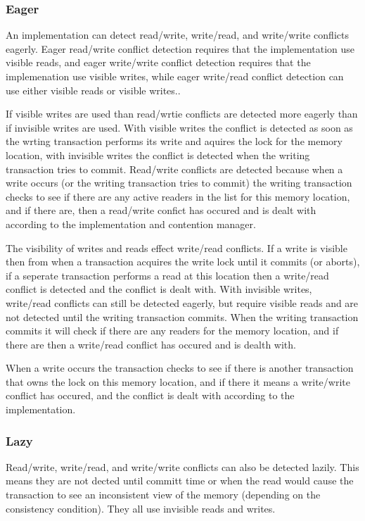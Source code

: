 \subsubsection{Eager}
An implementation can detect read/write, write/read, and write/write conflicts eagerly.
Eager read/write conflict detection requires that the implementation use visible reads, and eager write/write conflict detection requires that the implemenation use visible writes, while eager write/read conflict detection can use either visible reads or visible writes..

If visible writes are used than read/wrtie conflicts are detected more eagerly than if invisible writes are used.
With visible writes the conflict is detected as soon as the wrting transaction performs its write and aquires the lock for the memory location, with invisible writes the conflict is detected when the writing transaction tries to commit.
Read/write conflicts are detected because when a write occurs (or the writing transaction tries to commit) the writing transaction checks to see if there are any active readers in the list for this memory location, and if there are, then a read/write confict has occured and is dealt with according to the implementation and contention manager.

The visibility of writes and reads effect write/read conflicts.
If a write is visible then from when a transaction acquires the write lock until it commits (or aborts), if a seperate transaction performs a read at this location then a write/read conflict is detected and the conflict is dealt with.
With invisible writes, write/read conflicts can still be detected eagerly, but require visible reads and are not detected until the writing transaction commits.
When the writing transaction commits it will check if there are any readers for the memory location, and if there are then a write/read conflict has occured and is dealth with.

When a write occurs the transaction checks to see if there is another transaction that owns the lock on this memory location, and if there it means a write/write conflict has occured, and the conflict is dealt with according to the implementation.

\subsubsection{Lazy}
Read/write, write/read, and write/write conflicts can also be detected lazily.
This means they are not dected until committ time or when the read would cause the transaction to see an inconsistent view of the memory (depending on the consistency condition).
They all use invisible reads and writes.

